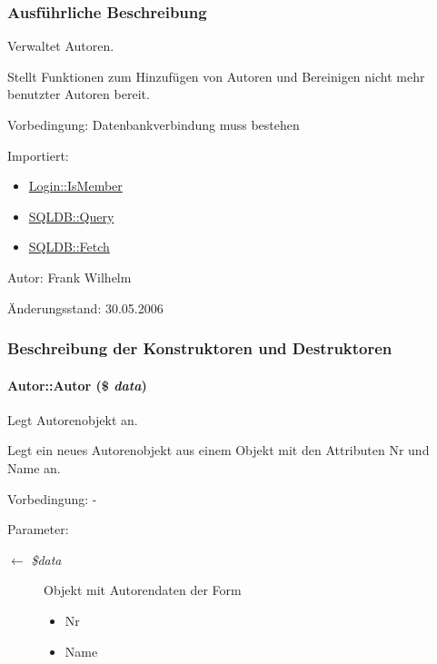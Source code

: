 \subsubsection{Ausf\"{u}hrliche Beschreibung}
Verwaltet Autoren. 

Stellt Funktionen zum Hinzufügen von Autoren und Bereinigen nicht mehr benutzter Autoren bereit. \begin{Desc}
\item[Vorbedingung:]Datenbankverbindung muss bestehen \end{Desc}
\begin{Desc}
\item[Importiert:]\begin{itemize}
\item \hyperlink{classLogin_70d2747b0aa454f4203a789afea25318}{Login::Is\-Member}\item \hyperlink{classSQLDB_fc6ffa8df50f68f07d9f5e3385b96d7a}{SQLDB::Query}\item \hyperlink{classSQLDB_a55c00ce1de0e50e0a58cae61892ba35}{SQLDB::Fetch}\end{itemize}
\end{Desc}
\begin{Desc}
\item[Autor:]Frank Wilhelm \end{Desc}
\begin{Desc}
\item[Änderungsstand:]30.05.2006 \end{Desc}




\subsubsection{Beschreibung der Konstruktoren und Destruktoren}
\hypertarget{classAutor_2302710dd8970853f5d49c62d4586e8f}{
\paragraph[Autor]{\setlength{\rightskip}{0pt plus 5cm}Autor::Autor (\$ {\em data})}\hfill}
\label{classAutor_2302710dd8970853f5d49c62d4586e8f}


Legt Autorenobjekt an. 

Legt ein neues Autorenobjekt aus einem Objekt mit den Attributen Nr und Name an. \begin{Desc}
\item[Vorbedingung:]- \end{Desc}
\begin{Desc}
\item[Parameter:]
\begin{description}
\item[\mbox{$\leftarrow$} {\em \$data}]Objekt mit Autorendaten der Form\begin{itemize}
\item Nr\item Name \end{itemize}
\end{description}
\end{Desc}


